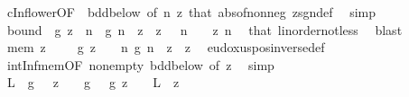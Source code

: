 \begin{isabellebody}
\ cInf{\isacharunderscore}{\kern0pt}lower{\isacharbrackleft}{\kern0pt}OF\ {\isacharunderscore}{\kern0pt}\ bdd{\isacharunderscore}{\kern0pt}below{\isacharunderscore}{\kern0pt}{\isasymphi}{\isacharcomma}{\kern0pt}\ of\ n\ z{\isacharbrackright}{\kern0pt}\ that\ abs{\isacharunderscore}{\kern0pt}of{\isacharunderscore}{\kern0pt}nonneg\ zsgn{\isacharunderscore}{\kern0pt}def\ \isamarkupfalse%
\ simp\isanewline
\ \ \isamarkupfalse%
\ {\isasymphi}{\isacharunderscore}{\kern0pt}bound{\isacharprime}{\kern0pt}{\isacharcolon}{\kern0pt}\ {\isachardoublequoteopen}{\isacharquery}{\kern0pt}{\isasymphi}\ g\ z\ {\isachargreater}{\kern0pt}\ n\ {\isasymLongrightarrow}\ g\ n\ {\isacharless}{\kern0pt}\ z{\isachardoublequoteclose}\ \ {\isachardoublequoteopen}z\ {\isasymge}\ {}{\isachardoublequoteclose}\ {\isachardoublequoteopen}n\ {\isasymge}\ {}{\isachardoublequoteclose}\ \ z\ n\ \isamarkupfalse%
\ that\ linorder{\isacharunderscore}{\kern0pt}not{\isacharunderscore}{\kern0pt}less\ \isamarkupfalse%
\ blast\isanewline
\isanewline
\ \ \isamarkupfalse%
\ {\isasymphi}{\isacharunderscore}{\kern0pt}mem{\isacharcolon}{\kern0pt}\ {\isachardoublequoteopen}z\ {\isachargreater}{\kern0pt}\ {}\ {\isasymLongrightarrow}\ {\isacharquery}{\kern0pt}{\isasymphi}\ g\ z\ {\isasymin}\ {\isacharbraceleft}{\kern0pt}{}{\isachardot}{\kern0pt}{\isachardot}{\kern0pt}{\isacharbraceright}{\kern0pt}\ {\isasyminter}\ {\isacharbraceleft}{\kern0pt}n{\isachardot}{\kern0pt}\ g\ n\ {\isasymge}\ {\isasymbar}z{\isasymbar}{\isacharbraceright}{\kern0pt}{\isachardoublequoteclose}\ \ z\ \isamarkupfalse%
\ eudoxus{\isacharunderscore}{\kern0pt}pos{\isacharunderscore}{\kern0pt}inverse{\isacharunderscore}{\kern0pt}def\ \isamarkupfalse%
\ int{\isacharunderscore}{\kern0pt}Inf{\isacharunderscore}{\kern0pt}mem{\isacharbrackleft}{\kern0pt}OF\ nonempty{\isacharunderscore}{\kern0pt}{\isasymphi}\ bdd{\isacharunderscore}{\kern0pt}below{\isacharunderscore}{\kern0pt}{\isasymphi}{\isacharcomma}{\kern0pt}\ of\ z{\isacharbrackright}{\kern0pt}\ \isamarkupfalse%
\ simp\isanewline
\isanewline
\ \ \isamarkupfalse%
\ L\ \ {\isachardoublequoteopen}{\isasymbar}g\ {\isacharparenleft}{\kern0pt}{}\ {\isacharplus}{\kern0pt}\ {\isacharparenleft}{\kern0pt}z\ {\isacharminus}{\kern0pt}\ {}{\isacharparenright}{\kern0pt}{\isacharparenright}{\kern0pt}\ {\isacharminus}{\kern0pt}\ {\isacharparenleft}{\kern0pt}g\ {}\ {\isacharplus}{\kern0pt}\ g\ {\isacharparenleft}{\kern0pt}z\ {\isacharminus}{\kern0pt}\ {}{\isacharparenright}{\kern0pt}{\isacharparenright}{\kern0pt}{\isasymbar}\ {\isasymle}\ L{\isachardoublequoteclose}\ \ z\ \isamarkupfalse%

\end{isabellebody}
